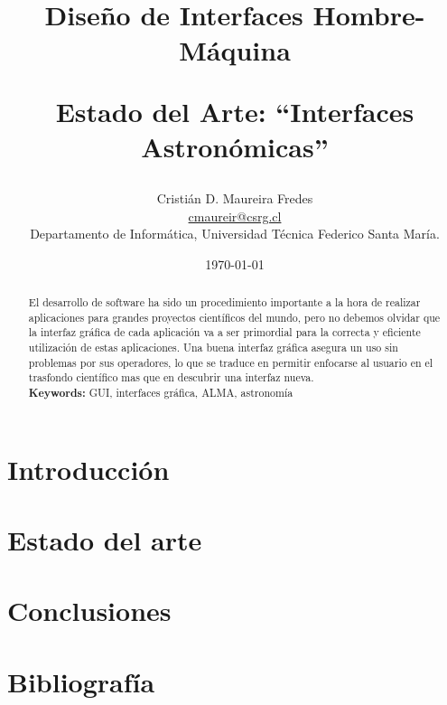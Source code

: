 \documentclass[letter, 10pt]{IEEEtran}
\begin{document}

\pagestyle{empty}

\title{Diseño de Interfaces Hombre-Máquina \\ \begin{Large}Estado del Arte: ``Interfaces Astronómicas''\end{Large}}
\author{Cristián D. Maureira Fredes\\\url{cmaureir@csrg.cl}\\Departamento de Informática, Universidad Técnica Federico Santa María.}
\date{\today}

\maketitle
\begin{abstract}
El desarrollo de software ha sido un procedimiento importante a la hora de realizar
aplicaciones para grandes proyectos científicos del mundo, pero no debemos olvidar
que la interfaz gráfica de cada aplicación va a ser primordial para la correcta y
eficiente utilización de estas aplicaciones.
Una buena interfaz gráfica asegura un uso sin problemas por sus operadores,
lo que se traduce en permitir enfocarse al usuario en el trasfondo científico
mas que en descubrir una interfaz nueva.\\
{\bf Keywords: } GUI, interfaces gráfica, ALMA, astronomía
\end{abstract}

\section{Introducción}
\label{sec:introduccion}


\section{Estado del arte}
\label{sec:estado_arte}


\section{Conclusiones}
\label{sec:conclusiones}


\section{Bibliografía}

\end{document}
